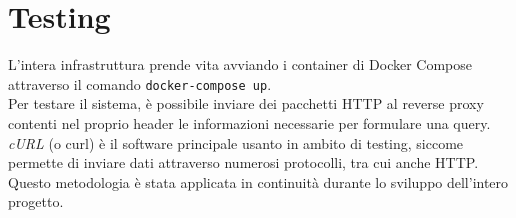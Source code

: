 \section{Testing}
L'intera infrastruttura prende vita avviando i container di Docker Compose attraverso il comando \texttt{docker-compose up}.
\\ Per testare il sistema, è possibile inviare dei pacchetti HTTP al reverse proxy contenti nel proprio header le informazioni necessarie per formulare una query.
\\ \textit{cURL} (o curl) \cite{curl} è il software principale usanto in ambito di testing, siccome permette di inviare dati attraverso 
numerosi protocolli, tra cui anche HTTP. 
\\ Questo metodologia è stata applicata in continuità durante lo sviluppo dell'intero progetto. 